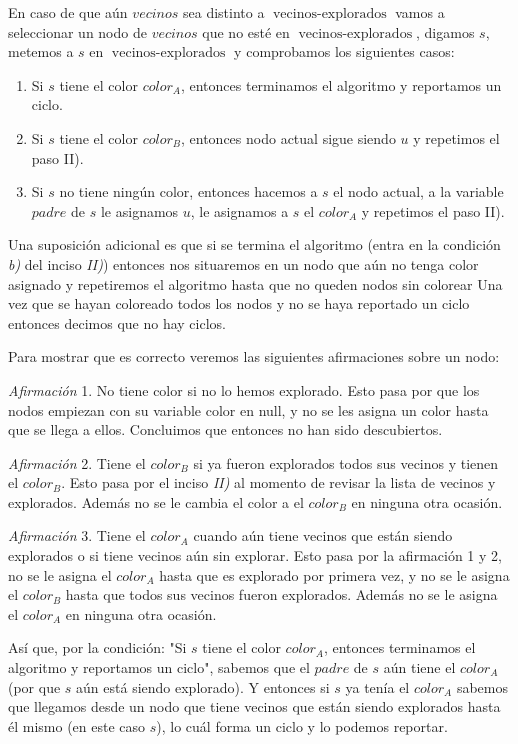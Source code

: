 \documentclass[11pt,letterpaper]{article}
\newcommand{\af}{\textit{Afirmación }}
\begin{document}
\begin{enumerate}[leftmargin=*]
\begin{enumerate}[label=\roman*)]
      En caso de que aún $vecinos$ sea distinto a $\operatorname{vecinos-explorados}$ vamos a seleccionar un nodo de $vecinos$ que no esté en $\operatorname{vecinos-explorados}$, digamos $s$, metemos a $s$ en $\operatorname{vecinos-explorados}$ y comprobamos los siguientes casos:
      \begin{enumerate}[label=\alph*)]
        \item Si $s$ tiene el color $color_A$, entonces terminamos el algoritmo y reportamos un ciclo.
        \item Si $s$ tiene el color $color_B$, entonces nodo actual sigue siendo $u$ y repetimos el paso II).
        \item Si $s$ no tiene ningún color, entonces hacemos a $s$ el nodo actual, a la variable $padre$ de $s$ le asignamos $u$, le asignamos a $s$ el $color_A$ y repetimos el paso II).
      \end{enumerate} 
    \end{enumerate}

    Una suposición adicional es que si se termina el algoritmo (entra en la condición \textit{b)} del inciso \textit{II)}) entonces nos situaremos en un nodo que aún no tenga color asignado y repetiremos el algoritmo hasta que no queden nodos sin colorear
    Una vez que se hayan coloreado todos los nodos y no se haya reportado un ciclo entonces decimos que no hay ciclos.
    
    Para mostrar que es correcto veremos las siguientes afirmaciones sobre un nodo:

    \af 1. No tiene color si no lo hemos explorado. 
    Esto pasa por que los nodos empiezan con su variable color en null, y no se les asigna un color hasta que se llega a ellos. 
    Concluimos que entonces no han sido descubiertos.
    
    \af 2. Tiene el $color_B$ si ya fueron explorados todos sus vecinos y tienen el $color_B$. 
    Esto pasa por el inciso \textit{II)} al momento de revisar la lista de vecinos y explorados.
    Además no se le cambia el color a el $color_B$ en ninguna otra ocasión.

    \af 3. Tiene el $color_A$ cuando aún tiene vecinos que están siendo explorados o si tiene vecinos aún sin explorar. 
    Esto pasa por la afirmación 1 y 2, no se le asigna el $color_A$ hasta que es explorado por primera vez, y no se le asigna el $color_B$ hasta que todos sus vecinos fueron explorados.
    Además no se le asigna el $color_A$ en ninguna otra ocasión.

    Así que, por la condición: "Si $s$ tiene el color $color_A$, entonces terminamos el algoritmo y reportamos un ciclo", sabemos que el $padre$ de $s$ aún tiene el $color_A$ (por que $s$ aún está siendo explorado).
    Y entonces si $s$ ya tenía el $color_A$ sabemos que llegamos desde un nodo que tiene vecinos que están siendo explorados hasta él mismo (en este caso $s$), lo cuál forma un ciclo y lo podemos reportar.


\end{enumerate}
\end{document}
